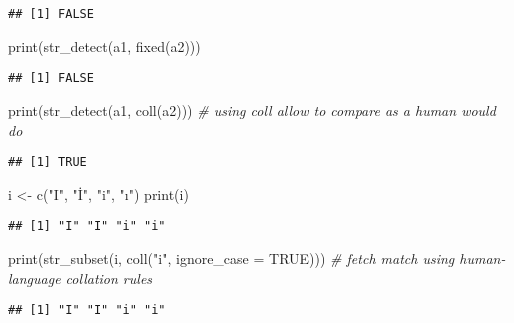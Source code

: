 \documentclass[
]{article}
\newenvironment{Shaded}{\begin{snugshade}}{\end{snugshade}}
\newcommand{\AttributeTok}[1]{\textcolor[rgb]{0.77,0.63,0.00}{#1}}
\newcommand{\CommentTok}[1]{\textcolor[rgb]{0.56,0.35,0.01}{\textit{#1}}}
\newcommand{\ConstantTok}[1]{\textcolor[rgb]{0.00,0.00,0.00}{#1}}
\newcommand{\FunctionTok}[1]{\textcolor[rgb]{0.00,0.00,0.00}{#1}}
\newcommand{\NormalTok}[1]{#1}
\newcommand{\OtherTok}[1]{\textcolor[rgb]{0.56,0.35,0.01}{#1}}
\newcommand{\StringTok}[1]{\textcolor[rgb]{0.31,0.60,0.02}{#1}}
\begin{document}
\begin{verbatim}
## [1] FALSE
\end{verbatim}

\begin{Shaded}
\begin{Highlighting}[]
\FunctionTok{print}\NormalTok{(}\FunctionTok{str\_detect}\NormalTok{(a1, }\FunctionTok{fixed}\NormalTok{(a2)))}
\end{Highlighting}
\end{Shaded}

\begin{verbatim}
## [1] FALSE
\end{verbatim}

\begin{Shaded}
\begin{Highlighting}[]
\FunctionTok{print}\NormalTok{(}\FunctionTok{str\_detect}\NormalTok{(a1, }\FunctionTok{coll}\NormalTok{(a2))) }\CommentTok{\# using coll allow to compare as a human would do}
\end{Highlighting}
\end{Shaded}

\begin{verbatim}
## [1] TRUE
\end{verbatim}

\begin{Shaded}
\begin{Highlighting}[]
\NormalTok{i }\OtherTok{\textless{}{-}} \FunctionTok{c}\NormalTok{(}\StringTok{"I"}\NormalTok{, }\StringTok{"İ"}\NormalTok{, }\StringTok{"i"}\NormalTok{, }\StringTok{"ı"}\NormalTok{)}
\FunctionTok{print}\NormalTok{(i)}
\end{Highlighting}
\end{Shaded}

\begin{verbatim}
## [1] "I" "I" "i" "i"
\end{verbatim}

\begin{Shaded}
\begin{Highlighting}[]
\FunctionTok{print}\NormalTok{(}\FunctionTok{str\_subset}\NormalTok{(i, }\FunctionTok{coll}\NormalTok{(}\StringTok{"i"}\NormalTok{, }\AttributeTok{ignore\_case =} \ConstantTok{TRUE}\NormalTok{))) }\CommentTok{\# fetch match using human{-}language collation rules}
\end{Highlighting}
\end{Shaded}

\begin{verbatim}
## [1] "I" "I" "i" "i"
\end{verbatim}
\end{document}
